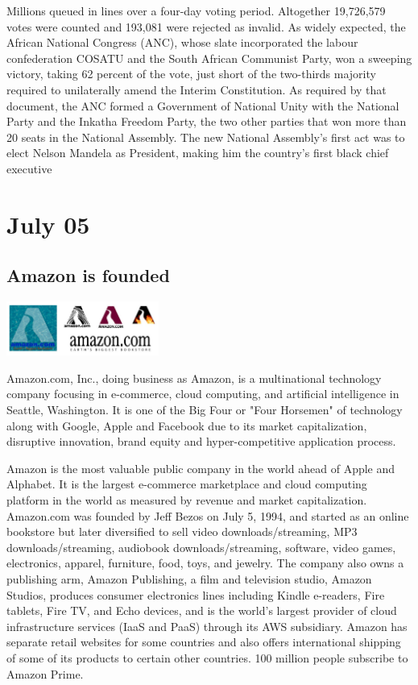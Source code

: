 \documentclass[11pt]{report}
\begin{document}
Millions queued in lines over a four-day voting period. Altogether 19,726,579 votes were counted and 193,081 were rejected as invalid. As widely expected, the African National Congress (ANC), whose slate incorporated the labour confederation COSATU and the South African Communist Party, won a sweeping victory, taking 62 percent of the vote, just short of the two-thirds majority required to unilaterally amend the Interim Constitution. As required by that document, the ANC formed a Government of National Unity with the National Party and the Inkatha Freedom Party, the two other parties that won more than 20 seats in the National Assembly. The new National Assembly's first act was to elect Nelson Mandela as President, making him the country's first black chief executive
\section{July 05}
\subsection{Amazon is founded}
\vspace{2mm}\begin{center}\includegraphics[width=5cm]{./img/amazon.jpg}\end{center}
Amazon.com, Inc., doing business as Amazon, is a multinational technology company focusing in e-commerce, cloud computing, and artificial intelligence in Seattle, Washington. It is one of the Big Four or "Four Horsemen" of technology along with Google, Apple and Facebook due to its market capitalization, disruptive innovation, brand equity and hyper-competitive application process.

Amazon is the most valuable public company in the world ahead of Apple and Alphabet. It is the largest e-commerce marketplace and cloud computing platform in the world as measured by revenue and market capitalization. Amazon.com was founded by Jeff Bezos on July 5, 1994, and started as an online bookstore but later diversified to sell video downloads/streaming, MP3 downloads/streaming, audiobook downloads/streaming, software, video games, electronics, apparel, furniture, food, toys, and jewelry. The company also owns a publishing arm, Amazon Publishing, a film and television studio, Amazon Studios, produces consumer electronics lines including Kindle e-readers, Fire tablets, Fire TV, and Echo devices, and is the world's largest provider of cloud infrastructure services (IaaS and PaaS) through its AWS subsidiary. Amazon has separate retail websites for some countries and also offers international shipping of some of its products to certain other countries. 100 million people subscribe to Amazon Prime.
\end{document}

